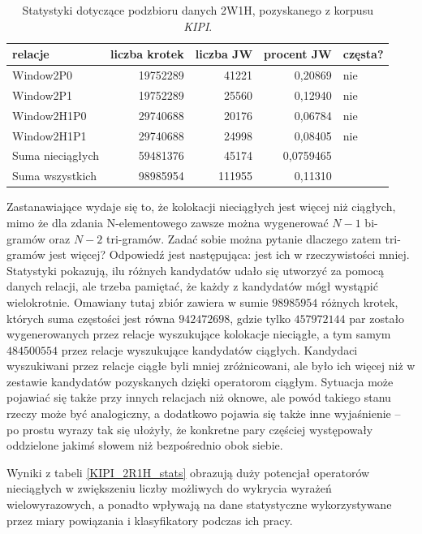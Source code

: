 \documentclass[11pt,a4paper]{llncs}
\begin{document}
\begin{table}[h!]
\centering
\begin{tabular}{ l | r | r | r | l }
	\toprule
	\textbf{relacje} 	& \textbf{liczba krotek} & \textbf{liczba JW} & \textbf{procent JW} & \textbf{częsta?} 	\\
	\midrule
	Window2P0	&	19752289	&	41221	&	0,20869	&	nie	\\
	Window2P1	&	19752289	&	25560	&	0,12940	&	nie	\\
	Window2H1P0	&	29740688	&	20176	&	0,06784	&	nie	\\
	Window2H1P1	&	29740688	&	24998	&	0,08405	&	nie	\\
	\midrule									
	Suma nieciągłych&	59481376	&	45174	&	0,0759465	&	\\
	Suma wszystkich	&	98985954	&	111955	&	0,11310	&		\\
	\bottomrule
\end{tabular}
\caption[Statystyki podzbioru danych \emph{KIPI} 2W1H]{Statystyki dotyczące podzbioru danych 2W1H, pozyskanego z korpusu \emph{KIPI}.}
\label{KIPI_2W1H_stats}
\end{table}

\par
Zastanawiające wydaje się to, że kolokacji nieciągłych jest więcej niż ciągłych, mimo że dla zdania N-elementowego zawsze można wygenerować $ N - 1 $ bi-gramów oraz $ N - 2 $ tri-gramów.
Zadać sobie można pytanie dlaczego zatem tri-gramów jest więcej?
Odpowiedź jest następująca: jest ich w rzeczywistości mniej.
Statystyki pokazują, ilu różnych kandydatów udało się utworzyć za pomocą danych relacji, ale trzeba pamiętać, że każdy z kandydatów mógł wystąpić wielokrotnie.
Omawiany tutaj zbiór zawiera w sumie $ 98 985 954 $ różnych krotek, których suma częstości jest równa $ 942 472 698 $, gdzie tylko $ 457 972 144 $ par zostało wygenerowanych przez relacje wyszukujące kolokacje nieciągłe, a tym samym $ 484 500 554 $ przez relacje wyszukujące kandydatów ciągłych.
Kandydaci wyszukiwani przez relacje ciągłe byli mniej zróżnicowani, ale było ich więcej niż w zestawie kandydatów pozyskanych dzięki operatorom ciągłym.
Sytuacja może pojawiać się także przy innych relacjach niż oknowe, ale powód takiego stanu rzeczy może być analogiczny, a dodatkowo pojawia się także inne wyjaśnienie -- po prostu wyrazy tak się ułożyły, że konkretne pary częściej występowały oddzielone jakimś słowem niż bezpośrednio obok siebie.

\par
Wyniki z tabeli \ref{KIPI_2R1H_stats} obrazują duży potencjał operatorów nieciągłych w zwiększeniu liczby możliwych do wykrycia wyrażeń wielowyrazowych, a ponadto wpływają na dane statystyczne wykorzystywane przez miary powiązania i klasyfikatory podczas ich pracy.
\end{document}
